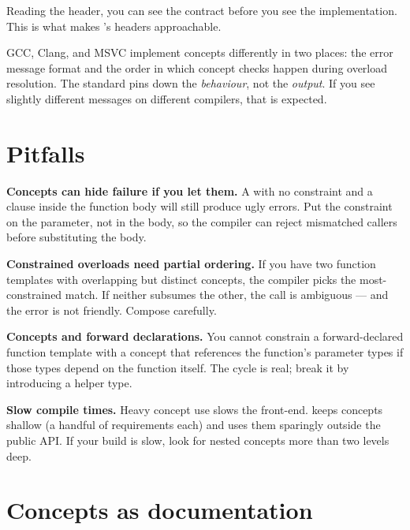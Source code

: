 Reading the header, you can see the contract before you see the
implementation. This is what makes \maya{}'s headers approachable.

\begin{funfact}
GCC, Clang, and MSVC implement concepts differently in two
places: the error message format and the order in which concept
checks happen during overload resolution. The standard pins down
the \emph{behaviour}, not the \emph{output}. If you see slightly
different messages on different compilers, that is expected.
\end{funfact}

\section{Pitfalls}

\begin{warning}
\textbf{Concepts can hide failure if you let them.} A
 with no constraint and a
 clause inside the function body will still
produce ugly errors. Put the constraint on the parameter, not in
the body, so the compiler can reject mismatched callers before
substituting the body.
\end{warning}

\begin{warning}
\textbf{Constrained overloads need partial ordering.} If you have
two function templates with overlapping but distinct concepts,
the compiler picks the most-constrained match. If neither
subsumes the other, the call is ambiguous --- and the error is
not friendly. Compose carefully.
\end{warning}

\begin{warning}
\textbf{Concepts and forward declarations.} You cannot constrain
a forward-declared function template with a concept that
references the function's parameter types if those types depend
on the function itself. The cycle is real; break it by
introducing a helper type.
\end{warning}

\begin{warning}
\textbf{Slow compile times.} Heavy concept use slows the
front-end. \maya{} keeps concepts shallow (a handful of
requirements each) and uses them sparingly outside the public
API. If your build is slow, look for nested concepts more than
two levels deep.
\end{warning}

\section{Concepts as documentation}

